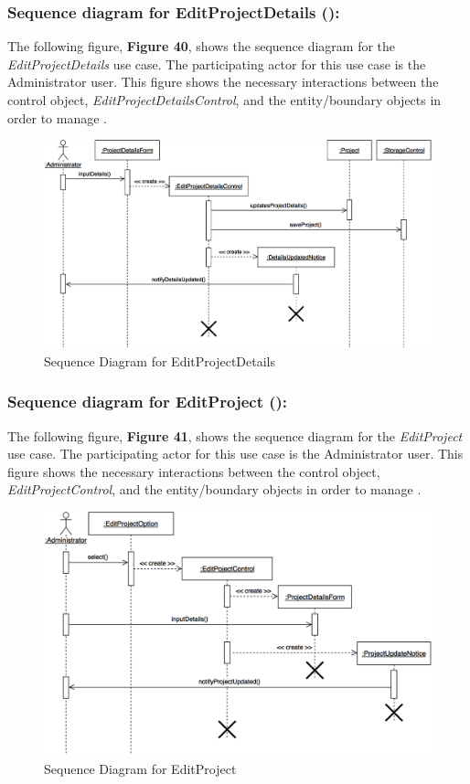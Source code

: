 \documentclass[12pt,letterpaper]{article}
\begin{document}
\subsubsection*{Sequence diagram for EditProjectDetails (\editprojectdetails{}):}

The following figure, {\bf Figure 40}, shows the sequence diagram for the {\it EditProjectDetails} use case. The participating actor for this use case is
the Administrator user. This figure shows the necessary interactions between the control object, {\it EditProjectDetailsControl}, and the
entity/boundary objects in order to manage \editprojectdetails{}.

\begin{figure}[H]
	\centering{}
	\includegraphics[scale=0.3]{imgs/seq/edit-project-details.png}
	\caption{Sequence Diagram for EditProjectDetails}
\end{figure}

\subsubsection*{Sequence diagram for EditProject (\editproject{}):}

The following figure, {\bf Figure 41}, shows the sequence diagram for the {\it EditProject} use case. The participating actor for this use case is
the Administrator user. This figure shows the necessary interactions between the control object, {\it EditProjectControl}, and the
entity/boundary objects in order to manage \editproject{}.

\begin{figure}[H]
	\centering{}
	\includegraphics[scale=0.3]{imgs/seq/edit-project.png}
	\caption{Sequence Diagram for EditProject}
\end{figure}
\end{document}
